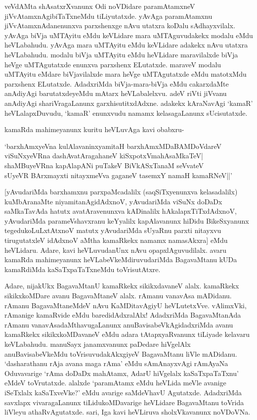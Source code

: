 veVdAMta shAsatxrXvanunx Odi noVDidare paramAtamxneV jiVvAtamxnAgibiTaTxneMdu tiLiyutatxde. yAvAga paramAtamxnu jiVvAtamxnAdanenunxva parxshenxge nAvu utatxra koDalu sAdhayxvilalx. yAvAga biVja uMTAyitu eMdu keVLidare mara uMTAguvudakekx modalu eMdu heVLabahudu. yAvAga mara uMTAyitu eMdu keVLidare adakekx nAvu utatxra heVLabahudu. modalu biVja uMTAyitu eMdu heVLidare maravilalxde biVja heVge uMTAgutatxde enunxva parxshenx ELutatxde. maraveV modalu uMTAyitu eMdare biVjavilalxde mara heVge uMTAgutatxde eMdu matotxMdu parxshenx ELutatxde. AdadxriMda biVja-mara-biVja eMdu cakarxdaMte anAdiyAgi barutatxdeyeMdu mAtarx heVLabalelxvu. adeV riVti jiVvanu anAdiyAgi shariVragaLanunx garxhisutitxdAdxne. adakekx kAraNavAgi `kamaR' heVLalapxDuvudu, `kamaR' enunxvudu namamx kelasagaLanunx sUcisutatxde.

kamaRda mahimeyanunx kuritu heVLuvAga kavi obabxru-

\begin{shloka}
`barxhAmxyeVna kulAlavaninxyamitaH barxhAmxMDaBAMDoVdareV\\
viSuNxyeVRna dashAvatAragahaneV kiSxpotxVmahAsaMkaTeV|\\
shaMBuyeVRna kapAlapANi puTakeV BiVkASxTanaM seVvateV\\
sUyeVR BArxmayxti nitayxmeVva gaganeV tasemxY namaH kamaRNeV||'
\end{shloka}

[yAvudariMda barxhamxnu parxpaMcadalilx (saqSiTxyenunxva kelasadalilx) kuMbAranaMte niyamitanAgidAdxnoV, yAvudariMda viSuNx doDaDx saMkaTavAda hatutx avatAravenunxva kADinalilx hAkalapxTiTxdAdxnoV, yAvudariMda parameVshavxranu keYyalilx kapAlavanunx hiDidu BikeSxyanunx tegedukoLuLxtAtxnoV matutx yAvudariMda sUyaRnu parxti nitayxvu tirugutatxleV idAdxnoV aMtha kamaRkekx namamx namasAkxra] eMdu heVLidaru. Adare, kavi heVLuvudanUnx nAvu opapxlAguvudilalx. avaru kamaRda mahimeyanunx heVLabeVkeMdiruvudariMda BagavaMtanu kUDa kamaRdiMda kaSaTxpaTaTxneMdu toVrisutAtxre.

Adare, nijakUkx BagavaMtanU kamaRkekx sikikxdavaneV alalx. kamaRkekx sikikxkoMDare avanu BagavaMtaneV alalx. rAmanu vanavAsa mADidanu. rAmanu BagavaMtaneMdeV nAvu KaMDitavAgiyU heVLutetxVve. vAlimxVki, rAmanige kamaRvide eMdu baredidAdxralAlx! AdadxriMda BagavaMtanAda rAmanu vanavAsadaMthavugaLanunx anuBavisabeVkAgidadxriMda avanu kamaRkekx sikikxkoMDavaneV eMdu adara tAtapxyaRvanunx tiLiyade kelavaru keVLabahudu. manuSayx janamxvanunx paDedare hiVgelAlx anuBavisabeVkeMdu toVrisuvudakAkxgiyeV BagavaMtanu liVle mADidanu. `dasharathanu rAja avana maga rAma' eMdu sAmAnayxvAgi rAmAyaNa Oduvavarige `rAma doDaDx mahAtamx, AdarU hiVgelalx kaSaTxpaTaTxnu' eMdeV toVrutatxde. alalxde `paramAtamx eMdu heVLida meVle avanige iSeTxlalx kaSaTxveVke?' eMdu avarige saMdeVhavU Agutatxde. AdadxriMda savxlapx vivaragaLanunx tiLidukoMDavarige heVLidare BagavaMtanu toVrida liVleyu athaRvAgutatxde. sari, Iga kavi heVLiruva sholxVkavanunx noVDoVNa.


